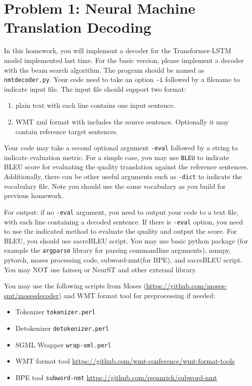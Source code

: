 \documentclass[12pt,letterpaper]{article}
\begin{document}
\section*{Problem 1: Neural Machine Translation Decoding} 
In this homework, you will implement a decoder for the Transformer-LSTM model 
implemented last time. 
For the basic version, please implement a decoder with the beam search algorithm. 
The program should be named as \texttt{nmtdecoder.py}.
Your code need to take an option \verb|-i| followed by a filename to indicate input file. 
The input file should support two format:
\begin{enumerate}
  \item plain text with each line contains one input sentence. 
  \item WMT xml format with includes the source sentence. Optionally it may contain reference target sentences. 
\end{enumerate}
Your code may take a second optional argument \verb|-eval| followed by a string to indicate evaluation metric. For a simple case, you may use \verb|BLEU| to indicate BLEU score for evaluating the quality translation against the reference sentences. 
Additionally, there can be other useful arguments such as \verb|-dict| to indicate the vocabulary file. Note you should use the same vocabulary as you build for previous homework. 

For output: if no \verb|-eval| argument, you need to output your code to a text file, with each line containing a decoded sentence. 
If there is \verb|-eval| option, you need to use the indicated method to evaluate the quality and output the score. 
For BLEU, you should use sacreBLEU script. 
You may use basic python package (for example the \texttt{argparse} library for parsing commandline arguments), numpy, pytorch, moses processing code, subword-nmt(for BPE), and sacreBLEU script. 
You may NOT use fairseq or NeurST and other external library. 


You may use the following scripts from Moses (\url{https://github.com/moses-smt/mosesdecoder}) and WMT format tool for preprocessing if needed:
\begin{itemize}
  \item Tokenizer \verb|tokenizer.perl|
  \item Detokenizer \verb|detokenizer.perl|
  \item SGML Wrapper \verb|wrap-xml.perl|
  \item WMT format tool \url{https://github.com/wmt-conference/wmt-format-tools}
  \item BPE tool \verb|subword-nmt| \url{https://github.com/rsennrich/subword-nmt}
\end{itemize}
\end{document}
